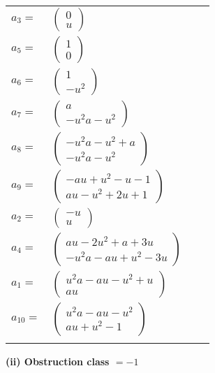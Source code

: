 \documentclass[1p]{elsarticle_modified}
\theoremstyle{definition}
\begin{document}
\begin{tabular}{m{7pt} m{180pt} m{7pt} m{180pt} }
\flushright $a_{3}=$&$\begin{pmatrix}0\\u\end{pmatrix}$ \\
\flushright $a_{5}=$&$\begin{pmatrix}1\\0\end{pmatrix}$ \\
\flushright $a_{6}=$&$\begin{pmatrix}1\\- u^2\end{pmatrix}$ \\
\flushright $a_{7}=$&$\begin{pmatrix}a\\- u^2 a- u^2\end{pmatrix}$ \\
\flushright $a_{8}=$&$\begin{pmatrix}- u^2 a- u^2+a\\- u^2 a- u^2\end{pmatrix}$ \\
\flushright $a_{9}=$&$\begin{pmatrix}- a u+u^2- u-1\\a u- u^2+2 u+1\end{pmatrix}$ \\
\flushright $a_{2}=$&$\begin{pmatrix}- u\\u\end{pmatrix}$ \\
\flushright $a_{4}=$&$\begin{pmatrix}a u-2 u^2+a+3 u\\- u^2 a- a u+u^2-3 u\end{pmatrix}$ \\
\flushright $a_{1}=$&$\begin{pmatrix}u^2 a- a u- u^2+u\\a u\end{pmatrix}$ \\
\flushright $a_{10}=$&$\begin{pmatrix}u^2 a- a u- u^2\\a u+u^2-1\end{pmatrix}$\\&\end{tabular}
\flushleft \textbf{(ii) Obstruction class $= -1$}\\~\\
\end{document}

